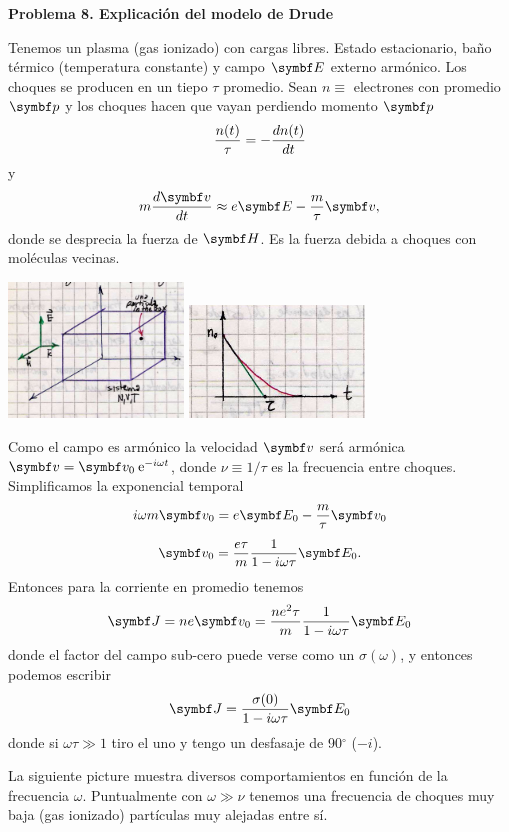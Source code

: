 \documentclass[10pt,oneside]{CBFT_book}
\begin{document}
\begin{ejemplo}{\bf Problema 8. Explicación del modelo de Drude}

Tenemos un plasma (gas ionizado) con cargas libres.
Estado estacionario, baño térmico (temperatura constante) y campo $\vb{E}$ externo armónico.
Los choques se producen en un tiepo $\tau$ promedio.
Sean $ n \equiv $ electrones con promedio $ \vb{p} $ y los choques hacen que vayan perdiendo
momento $\vb{p}$
\[
	\frac{n(t)}{\tau} = - \frac{d^{\hspace{-0.05em}} {n(t)}}{d {t}^{\hspace{-0.05em}}}
\]
y
\[
	m \dtot{\vb{v}}{t} \approx e \vb{E} - \frac{m}{\tau} \vb{v},
\]
donde se desprecia la fuerza de $\vb{H}$. Es la fuerza debida a choques con moléculas vecinas.

\includegraphics[width=0.35\textwidth]{images/fig_ft1_problema8.jpg} 
\includegraphics[width=0.35\textwidth]{images/fig_ft1_problema8B.jpg} 

Como el campo es armónico la velocidad $\vb{v}$ será armónica $ \vb{v} = \vb{v}_0 \euler^{- i \omega t} $,
donde $ \nu \equiv 1 / \tau $ es la frecuencia entre choques.
Simplificamos la exponencial temporal
\[
	i \omega m \vb{v}_0 = e \vb{E}_0 - \frac{m}{\tau} \vb{v}_0
\]
\[
	\vb{v}_0 = \frac{e\tau}{m} \frac{1}{1-i\omega\tau} \vb{E}_0.
\]
Entonces para la corriente en promedio tenemos
\[
	\vb{J} = n e \vb{v}_0 = \frac{n e^2 \tau}{m} \frac{1}{1-i\omega\tau} \vb{E}_0
\]
donde el factor del campo sub-cero puede verse como un $\sigma(\omega)$, y entonces
podemos escribir
\[
	\vb{J} = \frac{ \sigma(0) }{1 - i \omega \tau } \vb{E}_0
\]
donde si $\omega \tau \gg 1$ tiro el uno y tengo un desfasaje de 90$^\circ$ ($-i$).

La siguiente picture muestra diversos comportamientos en función de la frecuencia $\omega$.
Puntualmente con $\omega \gg \nu$ tenemos una frecuencia de choques muy baja (gas ionizado)
partículas muy alejadas entre sí.


\end{ejemplo}
\end{document}
